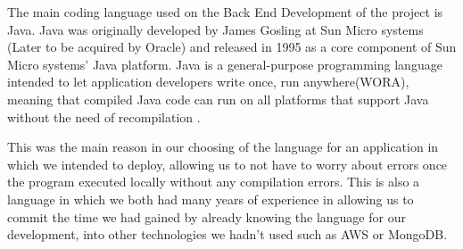 The main coding language used on the Back End Development of the project is Java. Java was originally developed by James Gosling at Sun Micro systems (Later to be acquired by Oracle) and released in 1995 as a core component of Sun Micro systems' Java platform. Java is a general-purpose programming language intended to let application developers write once, run anywhere(WORA), meaning that compiled Java code can run on all platforms that support Java without the need of recompilation \cite{Java}. \par
This was the main reason in our choosing of the language for an application in which we intended to deploy, allowing us to not have to worry about errors once the program executed locally without any compilation errors. This is also a language in which we both had many years of experience in allowing us to commit the time we had gained by already knowing the language for our development, into other technologies we hadn't used such as AWS or MongoDB.

